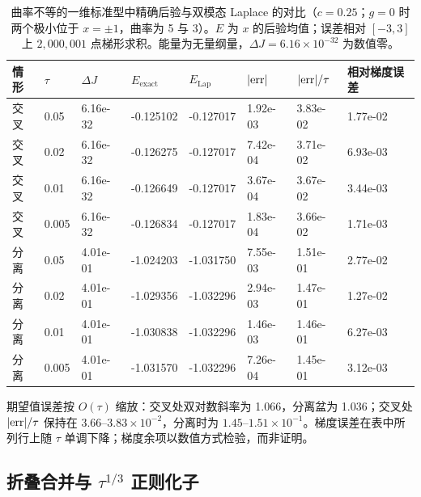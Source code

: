 \begin{table}[t]
\centering
\caption{曲率不等的一维标准型中精确后验与双模态 Laplace 的对比（$c=0.25$；$g=0$ 时两个极小位于 $x=\pm1$，曲率为 5 与 3）。$E$ 为 $x$ 的后验均值；误差相对 $[-3,3]$ 上 $2{,}000{,}001$ 点梯形求积。能量为无量纲量，$\Delta J=6.16\times10^{-32}$ 为数值零。}
\label{tab:1d}
\footnotesize
\setlength{\tabcolsep}{5pt}
\begin{tabular}{@{}l l l l l l l l@{}}
\toprule
情形 & $\tau$ & $\Delta J$ & $E_{\mathrm{exact}}$ & $E_{\mathrm{Lap}}$ & $|{\rm err}|$ & $|{\rm err}|/\tau$ & 相对梯度误差\\
\midrule
交叉 & 0.05 & 6.16e-32 & -0.125102 & -0.127017 & 1.92e-03 & 3.83e-02 & 1.77e-02\\
交叉 & 0.02 & 6.16e-32 & -0.126275 & -0.127017 & 7.42e-04 & 3.71e-02 & 6.93e-03\\
交叉 & 0.01 & 6.16e-32 & -0.126649 & -0.127017 & 3.67e-04 & 3.67e-02 & 3.44e-03\\
交叉 & 0.005 & 6.16e-32 & -0.126834 & -0.127017 & 1.83e-04 & 3.66e-02 & 1.71e-03\\
分离 & 0.05 & 4.01e-01 & -1.024203 & -1.031750 & 7.55e-03 & 1.51e-01 & 2.77e-02\\
分离 & 0.02 & 4.01e-01 & -1.029356 & -1.032296 & 2.94e-03 & 1.47e-01 & 1.27e-02\\
分离 & 0.01 & 4.01e-01 & -1.030838 & -1.032296 & 1.46e-03 & 1.46e-01 & 6.27e-03\\
分离 & 0.005 & 4.01e-01 & -1.031570 & -1.032296 & 7.26e-04 & 1.45e-01 & 3.12e-03\\
\bottomrule
\end{tabular}
\end{table}

期望值误差按 $O(\tau)$ 缩放：交叉处双对数斜率为 1.066，分离盆为 1.036；交叉处 $|{\rm err}|/\tau$ 保持在 $3.66$--$3.83\times10^{-2}$，分离时为 $1.45$--$1.51\times10^{-1}$。梯度误差在表中所列行上随 $\tau$ 单调下降；梯度余项以数值方式检验，而非证明。

\subsection{折叠合并与 \texorpdfstring{$\tau^{1/3}$}{tau^(1/3)} 正则化子}\label{sec:fold1d}

